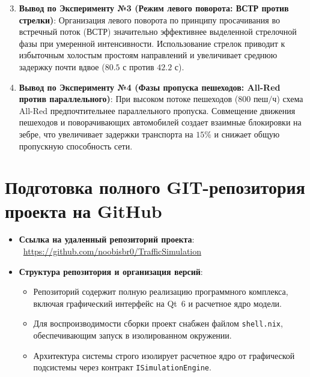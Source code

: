 \documentclass[11pt, a4paper]{article}
\begin{document}
\begin{enumerate}
  \setcounter{enumi}{2}
  \item \textbf{Вывод по Эксперименту №3 (Режим левого поворота: ВСТР против стрелки)}:
  Организация левого поворота по принципу просачивания во встречный поток (ВСТР) значительно эффективнее выделенной стрелочной фазы при умеренной интенсивности. Использование стрелок приводит к избыточным холостым простоям направлений и увеличивает среднюю задержку почти вдвое ($80.5\text{ с}$ против $42.2\text{ с}$).

  \item \textbf{Вывод по Эксперименту №4 (Фазы пропуска пешеходов: All-Red против параллельного)}:
  При высоком потоке пешеходов ($800\text{ пеш/ч}$) схема All-Red предпочтительнее параллельного пропуска. Совмещение движения пешеходов и поворачивающих автомобилей создает взаимные блокировки на зебре, что увеличивает задержки транспорта на $15\%$ и снижает общую пропускную способность сети.
\end{enumerate}

\section{Подготовка полного GIT-репозитория проекта на GitHub}
\begin{itemize}
  \item \textbf{Ссылка на удаленный репозиторий проекта}: \ \url{https://github.com/noobisbr0/TrafficSimulation}
  \item \textbf{Структура репозитория и организация версий}:
  \begin{itemize}
    \item Репозиторий содержит полную реализацию программного комплекса, включая графический интерфейс на Qt~6 и расчетное ядро модели.
    \item Для воспроизводимости сборки проект снабжен файлом \texttt{shell.nix}, обеспечивающим запуск в изолированном окружении.
    \item Архитектура системы строго изолирует расчетное ядро от графической подсистемы через контракт \texttt{ISimulationEngine}.
  \end{itemize}
\end{itemize}
\end{document}
